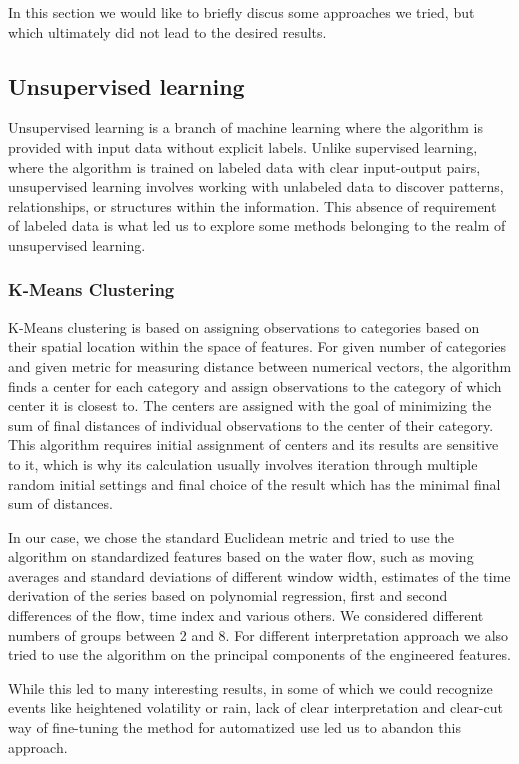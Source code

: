 \documentclass[12pt,a4paper]{article}
\begin{document}
In this section we would like to briefly discus some approaches we tried, but which ultimately did not lead to the desired results.


\subsection{Unsupervised learning}

Unsupervised learning is a branch of machine learning where the algorithm is provided with input data without explicit labels. Unlike supervised learning, where the algorithm is trained on labeled data with clear input-output pairs, unsupervised learning involves working with unlabeled data to discover patterns, relationships, or structures within the information. This absence of requirement of labeled data is what led us to explore some methods belonging to the realm of unsupervised learning. 

\subsubsection{K-Means Clustering}
K-Means clustering is based on  assigning observations to categories based on their spatial location within the space of features. For given number of categories and given metric for measuring distance between numerical vectors, the algorithm finds a center for each category and assign observations to the category of which center it is closest to. The centers are assigned with the goal of minimizing the sum of final distances of individual observations to the center of their category. This algorithm requires initial assignment of centers and its results are sensitive to it, which is why its calculation usually involves iteration through multiple random initial settings and final choice of the result which has the minimal final sum of distances.

In our case, we chose the standard Euclidean metric and tried to use the algorithm on standardized features based on the water flow, such as moving averages and standard deviations of different window width, estimates of the time derivation of the series based on polynomial regression, first and second differences of the flow, time index and various others. We considered different numbers of groups between 2 and 8. For different interpretation approach we also tried to use the algorithm on the principal components of the engineered features. 

While this led to many interesting results, in some of which we could recognize events like heightened volatility or rain, lack of clear interpretation and clear-cut way of fine-tuning the method for automatized use led us to abandon this approach.
\end{document}
